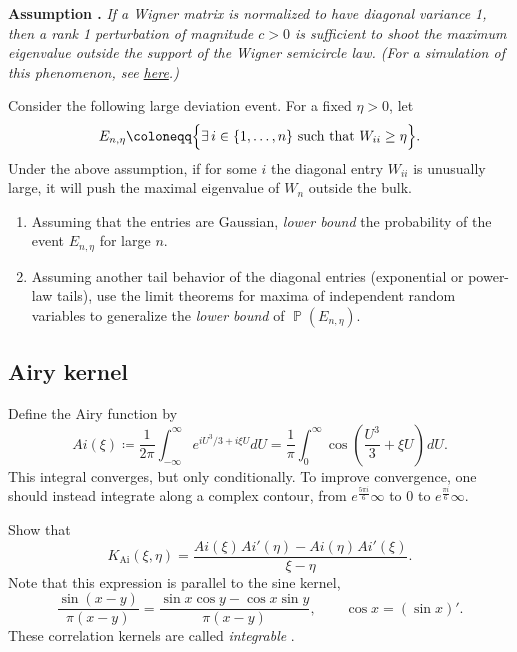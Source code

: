 \documentclass[letterpaper,11pt,oneside,reqno]{book}
\numberwithin{equation}{chapter}  %
\newcommand{\ssp}{\hspace{1pt}}
\theoremstyle{definition}
\begin{document}
\medskip

\textbf{Assumption \cite{BBP2005phase}.} \textit{If a Wigner matrix is normalized to have diagonal variance 1, then a rank 1 perturbation of magnitude $c>0$ is sufficient to shoot the maximum eigenvalue outside the support of the Wigner semicircle law. (For a simulation of this phenomenon, see \href{https://lpetrov.cc/simulations/2025-01-28-bbp-transition/}{here}.)}

\medskip

Consider the following large deviation event. For a fixed \(\eta>0\), let
\[
E_{n,\eta}\coloneqq \Bigl\{ \exists\, i\in\{1,\dots,n\} \text{ such that } W_{ii}\ge \eta \Bigr\}.
\]
Under the above assumption, if for some \(i\) the diagonal
entry \(W_{ii}\) is unusually large, it will push the
maximal eigenvalue of \(W_n\) outside the bulk.

\begin{enumerate}
	\item Assuming that the
		entries are Gaussian,
		\emph{lower bound} the probability of the event \(E_{n,\eta}\) for large \(n\).
	\item
		Assuming another tail behavior of the diagonal entries (exponential or
		power-law tails),
		use the limit theorems for maxima of independent random variables to generalize the
		\emph{lower bound} of $\operatorname{\mathbb{P}}(E_{n,\eta})$.
\end{enumerate}



\subsection{Airy kernel}
\label{lecture7:prob:airy}

Define the Airy function by
\begin{equation*}
	Ai(\xi)\coloneqq
	\frac{1}{2\pi}\int_{-\infty}^\infty
	e^{i U^3/3+i\xi U} dU=
	\frac{1}{\pi}\int_0^\infty
	\cos\left( \frac{U^3}{3}+\xi U \right)\ssp dU.
\end{equation*}
This integral converges, but only conditionally. To improve convergence,
one should instead integrate
along a complex contour,
from $e^{\frac{5 \pi i}{6}}\infty$ to $0$ to
$e^{\frac{\pi i}{6}}\infty$.

Show that
\begin{equation*}
	K_{\mathrm{Ai}}(\xi,\eta)=
	\frac{Ai(\xi)\ssp Ai'(\eta)-Ai(\eta)\ssp Ai'(\xi)}{\xi-\eta}.
\end{equation*}
Note that this expression is parallel to the sine kernel,
\begin{equation*}
	\frac{\sin(x-y)}{\pi(x-y)}=\frac{\sin x\cos y-\cos x\sin y}{\pi(x-y)},\qquad
	\cos x=(\sin x)'.
\end{equation*}
These correlation kernels are called \emph{integrable}
\cite{its1990differential}.
\end{document}
